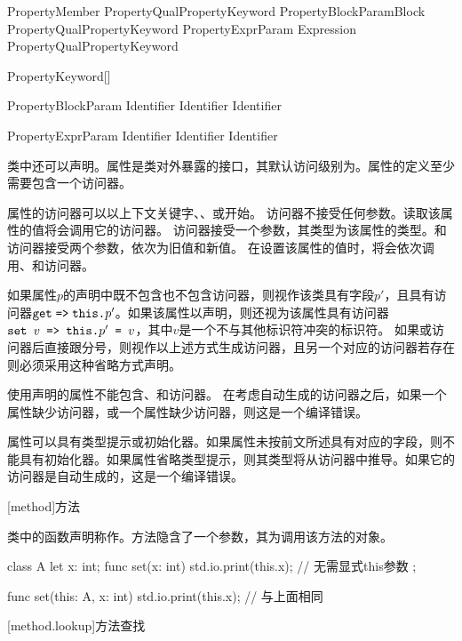 \begin{bnf}{PropertyMember}
    PropertyQual\bnfs PropertyKeyword PropertyBlockParam\bnfq Block \br
    PropertyQual\bnfs PropertyKeyword PropertyExprParam\bnfq \terminal{=>} Expression \terminal{;} \br
    PropertyQual\bnfs PropertyKeyword \terminal{;}
\end{bnf}

\begin{bnf}{PropertyKeyword}[\oneof]
\end{bnf}

\begin{bnf}{PropertyBlockParam}
    Identifier \br
    Identifier \terminal{,} Identifier
\end{bnf}

\begin{bnf}{PropertyExprParam}
    Identifier \br
    \terminal{(} Identifier \terminal{,} Identifier \terminal{)}
\end{bnf}

\pnum
类中还可以声明。属性是类对外暴露的接口，其默认访问级别为。属性的定义至少需要包含一个访问器。

\pnum
属性的访问器可以以上下文关键字、、或开始。
访问器不接受任何参数。读取该属性的值将会调用它的访问器。
访问器接受一个参数，其类型为该属性的类型。和访问器接受两个参数，依次为旧值和新值。
在设置该属性的值时，将会依次调用、和访问器。

\pnum
如果属性$p$的声明中既不包含也不包含访问器，则视作该类具有字段$p'$，且具有访问器$\texttt{get}\mathrel{\texttt{=>}}\texttt{this.}p'$。如果该属性以声明，则还视为该属性具有访问器$\texttt{set }v\texttt{ => this.}p'\texttt{ = }v$，其中$v$是一个不与其他标识符冲突的标识符。
如果或访问器后直接跟分号，则视作以上述方式生成访问器，且另一个对应的访问器若存在则必须采用这种省略方式声明。

\pnum
使用声明的属性不能包含、和访问器。
在考虑自动生成的访问器之后，如果一个属性缺少访问器，或一个属性缺少访问器，则这是一个编译错误。

\pnum
属性可以具有类型提示或初始化器。如果属性未按前文所述具有对应的字段，则不能具有初始化器。如果属性省略类型提示，则其类型将从访问器中推导。如果它的访问器是自动生成的，这是一个编译错误。

[method]{方法}

\pnum
类中的函数声明称作。方法隐含了一个参数，其为调用该方法的对象。

\enterexample
\begin{codeblock}
class A {
    let x: int;
    func set(x: int) {
        std.io.print(this.x); // 无需显式this参数
    }
};

func set(this: A, x: int) {
    std.io.print(this.x); // 与上面相同
}

\end{codeblock}
\exitexample

[method.lookup]{方法查找}

\pnum
